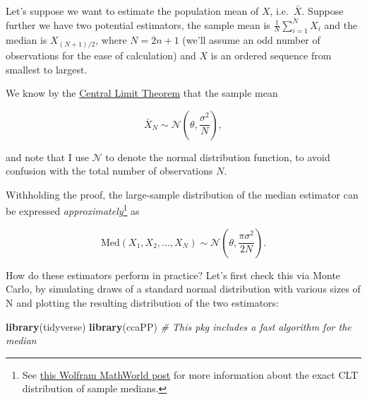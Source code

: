 \documentclass[
]{book}
\newenvironment{Shaded}{\begin{snugshade}}{\end{snugshade}}
\newcommand{\CommentTok}[1]{\textcolor[rgb]{0.56,0.35,0.01}{\textit{#1}}}
\newcommand{\KeywordTok}[1]{\textcolor[rgb]{0.13,0.29,0.53}{\textbf{#1}}}
\newcommand{\NormalTok}[1]{#1}
\begin{document}
Let's suppose we want to estimate the population mean of \(X\), i.e.~\(\bar{X}\). Suppose further we have two potential estimators, the sample mean is \(\frac{1}{N}\sum_{i=1}^N X_i\) and the median is \(X_{(N+1)/2}\), where \(N = 2n + 1\) (we'll assume an odd number of observations for the ease of calculation) and \(X\) is an ordered sequence from smallest to largest.

We know by the \protect\hyperlink{clt}{Central Limit Theorem} that the sample mean

\[ \bar{X}_N \sim \mathcal{N}(\theta, \frac{\sigma^2}{N}), \]

and note that I use \(\mathcal{N}\) to denote the normal distribution function, to avoid confusion with the total number of observations \(N\).

Withholding the proof, the large-sample distribution of the median estimator can be expressed \emph{approximately}\footnote{See \href{https://mathworld.wolfram.com/StatisticalMedian.html}{this Wolfram MathWorld post} for more information about the exact CLT distribution of sample medians.} as

\[ \text{Med}(X_1,X_2,...,X_N) \sim \mathcal{N}(\theta, \frac{\pi\sigma^2}{2N}). \]

How do these estimators perform in practice? Let's first check this via Monte Carlo, by simulating draws of a standard normal distribution with various sizes of N and plotting the resulting distribution of the two estimators:

\begin{Shaded}
\begin{Highlighting}[]
\KeywordTok{library}\NormalTok{(tidyverse)}
\KeywordTok{library}\NormalTok{(ccaPP) }\CommentTok{# This pkg includes a fast algorithm for the median}
\end{Highlighting}
\end{Shaded}
\end{document}
